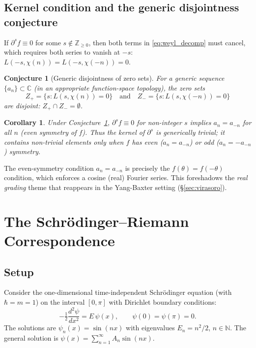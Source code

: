 \documentclass[%
 aip,
 amsmath,amssymb,
 reprint,%
]{revtex4-1}
\theoremstyle{plain}
\newtheorem{conjecture}{Conjecture}[section]
\newtheorem{corollary}[theorem]{Corollary}
\theoremstyle{definition}
\newcommand{\C}{\mathbb{C}}
\newcommand{\Z}{\mathbb{Z}}
\newcommand{\N}{\mathbb{N}}
\begin{document}
\subsection{Kernel condition and the generic disjointness conjecture}

If $\partial^s f \equiv 0$ for some $s \notin \Z_{\geq 0}$, then both terms in
\eqref{eq:weyl_decomp} must cancel, which requires both series to vanish at $-s$:
$L(-s, \chi(n)) = L(-s, \chi(-n)) = 0$.

\begin{conjecture}[Generic disjointness of zero sets]
\label{conj:weyl}
For a generic sequence $\{a_n\} \subset \C$ (in an appropriate function-space
topology), the zero sets
\[
Z_+ = \{s : L(s, \chi(n)) = 0\} \quad\text{and}\quad Z_- = \{s : L(s, \chi(-n)) = 0\}
\]
are disjoint: $Z_+ \cap Z_- = \emptyset$.
\end{conjecture}

\begin{corollary}
Under Conjecture~\ref{conj:weyl}, $\partial^s f \equiv 0$ for non-integer $s$
implies $a_n = a_{-n}$ for all $n$ (even symmetry of $f$). Thus the kernel of
$\partial^s$ is generically trivial; it contains non-trivial elements only when $f$
has even ($a_n = a_{-n}$) or odd ($a_n = -a_{-n}$) symmetry.
\end{corollary}

The even-symmetry condition $a_n = a_{-n}$ is precisely the $f(\theta) = f(-\theta)$
condition, which enforces a cosine (real) Fourier series. This foreshadows the
\emph{real grading} theme that reappears in the Yang-Baxter setting (\S\ref{sec:virasoro}).

\section{The Schr\"odinger--Riemann Correspondence}
\label{sec:schrodinger}

\subsection{Setup}

Consider the one-dimensional time-independent Schr\"odinger equation (with $\hbar = m = 1$)
on the interval $[0,\pi]$ with Dirichlet boundary conditions:
\begin{equation}
-\tfrac{1}{2}\frac{d^2\psi}{dx^2} = E\,\psi(x), \qquad \psi(0) = \psi(\pi) = 0.
\label{eq:schrodinger}
\end{equation}
The solutions are $\psi_n(x) = \sin(nx)$ with eigenvalues $E_n = n^2/2$, $n \in \N$.
The general solution is $\psi(x) = \sum_{n=1}^\infty A_n \sin(nx)$.
\end{document}

